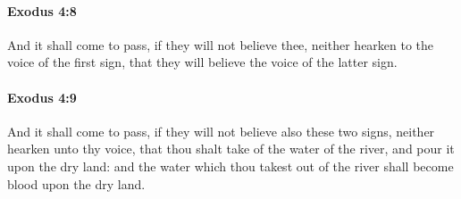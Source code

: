 		\paragraph{Exodus 4:8} %
			\label{EXODUS-4-8}

			And it shall come to pass, if they will not believe thee, neither hearken to the voice of the first sign, that they will believe the voice of the latter sign.


		\paragraph{Exodus 4:9} %
			\label{EXODUS-4-9}

			And it shall come to pass, if they will not believe also these two signs, neither hearken unto thy voice, that thou shalt take of the water of the river, and pour it upon the dry land: and the water which thou takest out of the river shall become blood upon the dry land.

